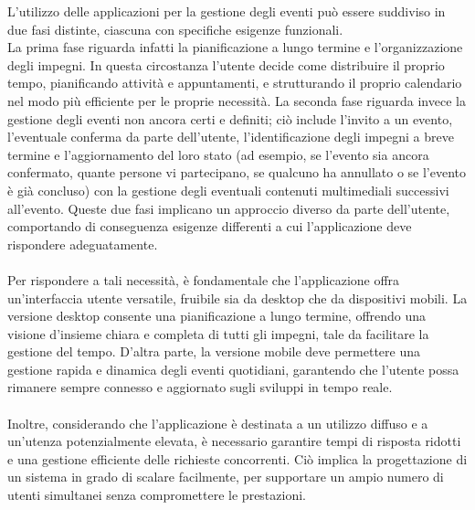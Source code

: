 L’utilizzo delle applicazioni per la gestione degli eventi può essere suddiviso in due fasi distinte, 
ciascuna con specifiche esigenze funzionali.\\
La prima fase riguarda infatti la pianificazione a lungo termine e l’organizzazione degli impegni.
In questa circostanza l’utente decide come distribuire il proprio tempo, pianificando attività e appuntamenti,
e strutturando il proprio calendario nel modo più efficiente per le proprie necessità.
La seconda fase riguarda invece la gestione degli eventi non ancora certi e definiti;
ciò include l’invito a un evento, l’eventuale conferma da parte dell’utente,
l’identificazione degli impegni a breve termine e l’aggiornamento del loro stato
(ad esempio, se l’evento sia ancora confermato, quante persone vi partecipano, se qualcuno ha annullato o se l'evento è già concluso)
con la gestione degli eventuali contenuti multimediali successivi all’evento. Queste due fasi implicano un approccio diverso da parte dell’utente,
comportando di conseguenza esigenze differenti a cui l’applicazione deve rispondere adeguatamente.\\
\\
Per rispondere a tali necessità, è fondamentale che l'applicazione offra un'interfaccia utente versatile, fruibile sia da desktop che da dispositivi mobili.
La versione desktop consente una pianificazione a lungo termine, offrendo una visione d'insieme chiara e completa di tutti gli impegni,
tale da facilitare la gestione del tempo.
D'altra parte, la versione mobile deve permettere una gestione rapida e dinamica degli eventi quotidiani,
garantendo che l'utente possa rimanere sempre connesso e aggiornato sugli sviluppi in tempo reale.\\
\\
Inoltre, considerando che l'applicazione è destinata a un utilizzo diffuso e a un'utenza potenzialmente elevata,
è necessario garantire tempi di risposta ridotti e una gestione efficiente delle richieste concorrenti.
Ciò implica la progettazione di un sistema in grado di scalare facilmente,
per supportare un ampio numero di utenti simultanei senza compromettere le prestazioni.\\
\\
\clearpage


